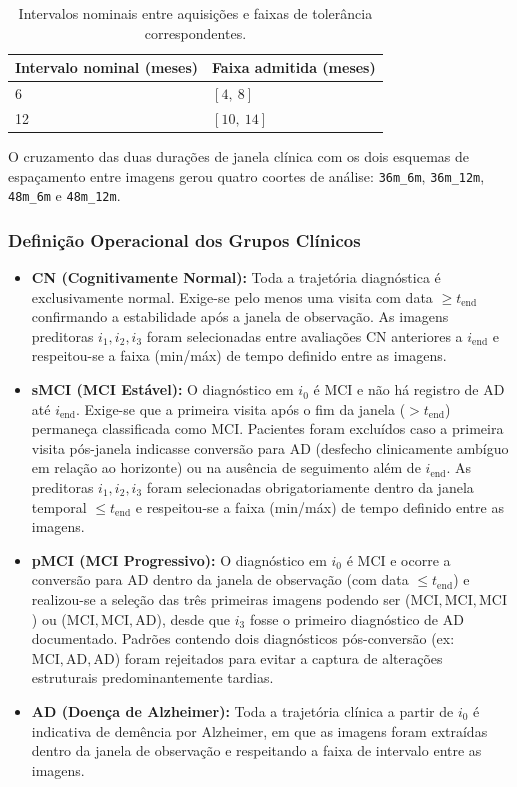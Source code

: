 \documentclass[review]{elsarticle}
\newcommand{\code}[1]{\texttt{#1}}
\begin{document}
\begin{table}[htbp]
	\centering
	\caption{Intervalos nominais entre aquisições e faixas de tolerância correspondentes.}
	\label{tab:bandas}
	\begin{tabular}{ll}
		\toprule
		Intervalo nominal (meses) & Faixa admitida (meses) \\
		\midrule
		6  & $[4,\ 8]$ \\
		12 & $[10,\ 14]$ \\
		\bottomrule
	\end{tabular}
\end{table}

O cruzamento das duas durações de janela clínica com os dois esquemas de espaçamento entre imagens gerou quatro coortes de análise: \code{36m\_6m}, \code{36m\_12m}, \code{48m\_6m} e \code{48m\_12m}.

\subsubsection{Definição Operacional dos Grupos Clínicos}

\begin{itemize}
	\item \textbf{CN (Cognitivamente Normal):} Toda a trajetória diagnóstica é exclusivamente normal. Exige-se pelo menos uma visita com data $\ge t_{\mathrm{end}}$ confirmando a estabilidade após a janela de observação. As imagens preditoras $i_1, i_2, i_3$ foram selecionadas entre avaliações CN anteriores a $i_{\mathrm{end}}$ e respeitou-se a faixa (min/máx) de tempo definido entre as imagens.
	
	\item \textbf{sMCI (MCI Estável):} O diagnóstico em $i_0$ é MCI e não há registro de AD até $i_{\mathrm{end}}$. Exige-se que a primeira visita após o fim da janela ($> t_{\mathrm{end}}$) permaneça classificada como MCI. Pacientes foram excluídos caso a primeira visita pós-janela indicasse conversão para AD (desfecho clinicamente ambíguo em relação ao horizonte) ou na ausência de seguimento além de $i_{\mathrm{end}}$. As preditoras $i_1, i_2, i_3$ foram selecionadas obrigatoriamente dentro da janela temporal $\le t_{\mathrm{end}}$ e respeitou-se a faixa (min/máx) de tempo definido entre as imagens.
	
	\item \textbf{pMCI (MCI Progressivo):} O diagnóstico em $i_0$ é MCI e ocorre a conversão para AD dentro da janela de observação (com data $\le t_{\mathrm{end}}$) e realizou-se a seleção das três primeiras imagens podendo ser ($\mathrm{MCI}, \mathrm{MCI}, \mathrm{MCI}$) ou ($\mathrm{MCI}, \mathrm{MCI}, \mathrm{AD}$), desde que $i_3$ fosse o primeiro diagnóstico de AD documentado. Padrões contendo dois diagnósticos pós-conversão (ex: $\mathrm{MCI}, \mathrm{AD}, \mathrm{AD}$) foram rejeitados para evitar a captura de alterações estruturais predominantemente tardias.
	
	\item \textbf{AD (Doença de Alzheimer):} Toda a trajetória clínica a partir de $i_0$ é indicativa de demência por Alzheimer, em que as imagens foram extraídas dentro da janela de observação e respeitando a faixa de intervalo entre as imagens.
\end{itemize}
\end{document}
